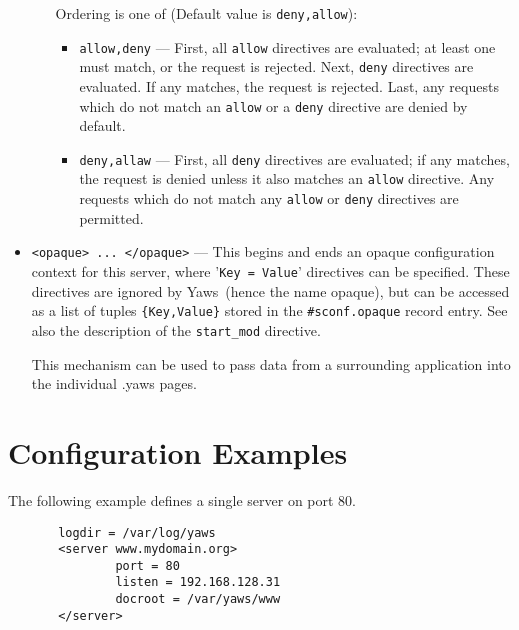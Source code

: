 \documentclass[11pt,oneside,english]{book}
\newcommand{\Yaws}            %
        {{\sc Yaws}}
\begin{document}
\begin{itemize}
\begin{itemize}
                Ordering is one of (Default value is \verb+deny,allow+):
                \begin{itemize}
                  \item \verb+allow,deny+ --- First, all \verb+allow+ directives
                    are evaluated; at least one must match, or the request is
                    rejected. Next, \verb+deny+ directives are evaluated. If any
                    matches, the request is rejected. Last, any requests which
                    do not match an \verb+allow+ or a \verb+deny+ directive are
                    denied by default.

                  \item \verb+deny,allaw+ --- First, all \verb+deny+ directives
                    are evaluated; if any matches, the request is denied unless
                    it also matches an \verb+allow+ directive. Any requests
                    which do not match any \verb+allow+ or \verb+deny+
                    directives are permitted.
                \end{itemize}
              \end{itemize}

\item       \verb+<opaque> ... </opaque>+ ---
              This begins and ends an opaque configuration context for this
              server, where '\verb+Key = Value+' directives can be
              specified. These directives are ignored by \Yaws\ (hence the name
              opaque), but can be accessed as a list of tuples
              \verb+{Key,Value}+ stored in the \verb+#sconf.opaque+ record
              entry. See also the description of the \verb+start_mod+ directive.

              This mechanism can be used to pass data from a surrounding
              application into the individual .yaws pages.
\end{itemize}




\section{Configuration Examples}

       The  following  example  defines a single server on
       port 80.

\begin{verbatim}
       logdir = /var/log/yaws
       <server www.mydomain.org>
               port = 80
               listen = 192.168.128.31
               docroot = /var/yaws/www
       </server>
\end{verbatim}
\end{document}
